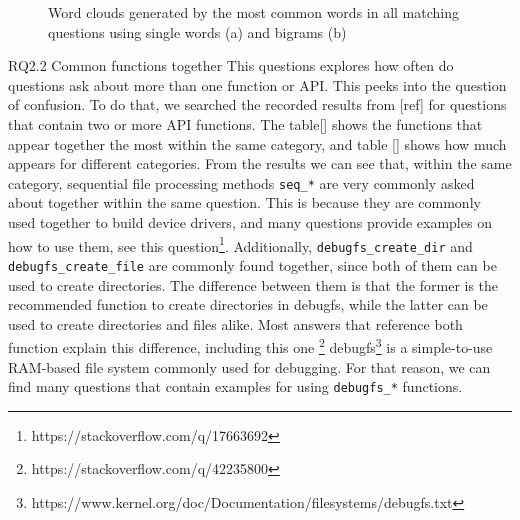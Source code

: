 \begin{figure}[t!]
  \centering
  \qquad
  \caption{Word clouds generated by the most common words in all matching questions using single words (a) and bigrams (b)}
  \label{fig:wcall}
\end{figure}

RQ2.2
Common functions together
This questions explores how often do questions ask about more than one function or API. This peeks into the question of confusion. To do that, we searched the recorded results from [ref] for questions that contain two or more API functions. The table[] shows the functions that appear together the most within the same category, and table [] shows how much appears for different categories. From the results we can see that, within the same category, sequential file processing methods \texttt{seq\_*} are very commonly asked about together within the same question. This is because they are commonly used together to build device drivers, and many questions provide examples on how to use them, see this question\footnote{https://stackoverflow.com/q/17663692}.
Additionally, \texttt{debugfs\_create\_dir} and \texttt{debugfs\_create\_file} are commonly found together, since both of them can be used to create directories. The difference between them is that the former is the recommended function to create directories in debugfs, while the latter can be used to create directories and files alike. Most answers that reference both function explain this difference, including this one \footnote{https://stackoverflow.com/q/42235800}
debugfs\footnote{https://www.kernel.org/doc/Documentation/filesystems/debugfs.txt} is a simple-to-use RAM-based file system commonly used for debugging. For that reason, we can find many questions that contain examples for using \texttt{debugfs\_*} functions.


